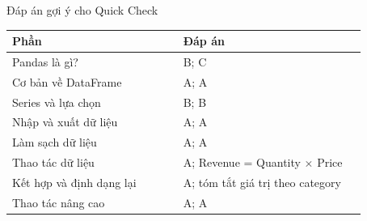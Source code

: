 \documentclass[aspectratio=169,11pt]{beamer}
\begin{document}
\begin{frame}{Đáp án gợi ý cho Quick Check}
\small
\begin{tabular}{p{0.42\linewidth}p{0.45\linewidth}}
\toprule
\textbf{Phần} & \textbf{Đáp án} \\
\midrule
Pandas là gì? & B; C \\
Cơ bản về DataFrame & A; A \\
Series và lựa chọn & B; B \\
Nhập và xuất dữ liệu & A; A \\
Làm sạch dữ liệu & A; A \\
Thao tác dữ liệu & A; Revenue = Quantity $\times$ Price \\
Kết hợp và định dạng lại & A; tóm tắt giá trị theo category \\
Thao tác nâng cao & A; A \\
\bottomrule
\end{tabular}
\end{frame}
\end{document}
